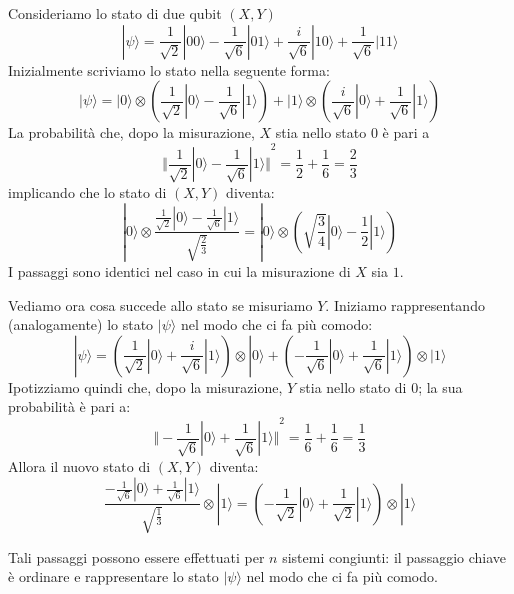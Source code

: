 \begin{example}{}{}
    Consideriamo lo stato di due qubit $(X,Y)$ 
    \begin{equation*}
        |\psi\rangle = \frac{1}{\sqrt{2}}|00\rangle - \frac{1}{\sqrt{6}}|01\rangle + \frac{i}{\sqrt{6}}|10\rangle + \frac{1}{\sqrt{6}}|11\rangle
    \end{equation*}
    Inizialmente scriviamo lo stato nella seguente forma:
    \begin{equation*}
        |\psi\rangle = |0\rangle \otimes \left(\frac{1}{\sqrt{2}}|0\rangle - \frac{1}{\sqrt{6}}|1\rangle\right) + |1\rangle \otimes \left(\frac{i}{\sqrt{6}}|0\rangle + \frac{1}{\sqrt{6}}|1\rangle\right)
    \end{equation*}
    La probabilità che, dopo la misurazione, $X$ stia nello stato $0$ è pari a
    \begin{equation*}
        {\Vert \frac{1}{\sqrt{2}}|0\rangle - \frac{1}{\sqrt{6}}|1\rangle \Vert}^2 = \frac{1}{2} + \frac{1}{6} = \frac{2}{3}
    \end{equation*}
    implicando che lo stato di $(X,Y)$ diventa:
    \begin{equation*}
        |0\rangle \otimes \frac{\frac{1}{\sqrt{2}}|0\rangle - \frac{1}{\sqrt{6}}|1\rangle}{\sqrt{\frac{2}{3}}} = |0\rangle \otimes \left(\sqrt{\frac{3}{4}}|0\rangle - \frac{1}{2}|1\rangle\right)
    \end{equation*}
    I passaggi sono identici nel caso in cui la misurazione di $X$ sia $1$.

    Vediamo ora cosa succede allo stato se misuriamo $Y$. Iniziamo rappresentando (analogamente) lo stato $|\psi\rangle$ nel modo che ci fa più comodo:
    \begin{equation*}
        |\psi\rangle = \left( \frac{1}{\sqrt{2}}|0\rangle + \frac{i}{\sqrt{6}}|1\rangle \right) \otimes |0\rangle + \left(  - \frac{1}{\sqrt{6}}|0\rangle + \frac{1}{\sqrt{6}}|1\rangle \right) \otimes |1\rangle
    \end{equation*}
    Ipotizziamo quindi che, dopo la misurazione, $Y$ stia nello stato di $0$; la sua probabilità è pari a:
    \begin{equation*}
        {\Vert - \frac{1}{\sqrt{6}}|0\rangle + \frac{1}{\sqrt{6}}|1\rangle \Vert}^2 = \frac{1}{6} + \frac{1}{6} = \frac{1}{3}
    \end{equation*}
    Allora il nuovo stato di $(X,Y)$ diventa:
    \begin{equation*}
         \frac{-\frac{1}{\sqrt{6}}|0\rangle + \frac{1}{\sqrt{6}}|1\rangle}{\sqrt{\frac{1}{3}}} \otimes |1\rangle  =   \left( - \frac{1}{\sqrt{2}} |0\rangle + \frac{1}{\sqrt{2}} |1\rangle  \right) \otimes |1\rangle
    \end{equation*}
\end{example}
Tali passaggi possono essere effettuati per $n$ sistemi congiunti: il passaggio chiave è ordinare e rappresentare lo stato $|\psi\rangle$ nel modo che ci fa più comodo.

